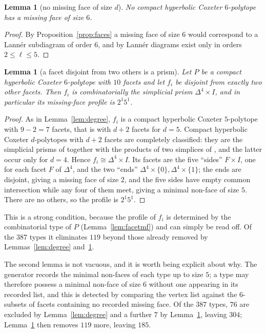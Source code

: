 \documentclass[11pt,reqno]{amsart}
\theoremstyle{plain}
\newtheorem{lemma}[theorem]{Lemma}
\theoremstyle{definition}
\newcommand{\NumTypes}{387}
\newcommand{\NumDegKilled}{76}
\newcommand{\NumBigMF}{7}
\newcommand{\NumPrism}{119}
\newcommand{\NumAfterComb}{185}
\newcommand{\NumAfterDegMF}{304}
\begin{document}
\begin{lemma}[no missing face of size $d$]
\label{lem:mfsix}
No compact hyperbolic Coxeter $6$-polytope has a missing face of size $6$.
\end{lemma}
\begin{proof}
By Proposition~\ref{prop:faces} a missing face of size $6$ would correspond to a
Lann\'er subdiagram of order $6$, and by \cite{Lanner1950} Lann\'er diagrams exist
only in orders $2\le\ell\le5$.
\end{proof}

\begin{lemma}[a facet disjoint from two others is a prism]
\label{lem:prism}
Let $P$ be a compact hyperbolic Coxeter $6$-polytope with $10$ facets and let $f_i$
be disjoint from exactly two other facets. Then $f_i$ is combinatorially the
simplicial prism $\Delta^4\times I$, and in particular its missing-face profile is
$2^1 5^1$.
\end{lemma}
\begin{proof}
As in Lemma~\ref{lem:degree}, $f_i$ is a compact hyperbolic Coxeter $5$-polytope
with $9-2=7$ facets, that is with $d+2$ facets for $d=5$. Compact hyperbolic
Coxeter $d$-polytopes with $d+2$ facets are completely classified: they are the
simplicial prisms of \cite{Kaplinskaja1974} together with the products of two
simplices of \cite{Esselmann1996}, and the latter occur only for $d=4$. Hence
$f_i\cong\Delta^4\times I$. Its facets are the five ``sides'' $F\times I$, one for
each facet $F$ of $\Delta^4$, and the two ``ends'' $\Delta^4\times\{0\},
\Delta^4\times\{1\}$; the ends are disjoint, giving a missing face of size $2$, and
the five sides have empty common intersection while any four of them meet, giving a
minimal non-face of size $5$. There are no others, so the profile is $2^1 5^1$.
\end{proof}

This is a strong condition, because the profile of $f_i$ is determined by the
combinatorial type of $P$ (Lemma~\ref{lem:facetmf}) and can simply be read off. Of the
$\NumTypes$ types it eliminates $\NumPrism$ beyond those already removed by
Lemmas~\ref{lem:degree} and~\ref{lem:mfsix}.

The second lemma is not vacuous, and it is worth being explicit about why. The
generator records the minimal non-faces of each type up to size $5$; a type may
therefore possess a minimal non-face of size $6$ without one appearing in its
recorded list, and this is detected by comparing the vertex list against the
$6$-subsets of facets containing no recorded missing face. Of the $\NumTypes$
types, $\NumDegKilled$ are excluded by Lemma~\ref{lem:degree} and a further
$\NumBigMF$ by Lemma~\ref{lem:mfsix}, leaving $\NumAfterDegMF$; Lemma~\ref{lem:prism}
then removes $\NumPrism$ more, leaving $\NumAfterComb$.
\end{document}
